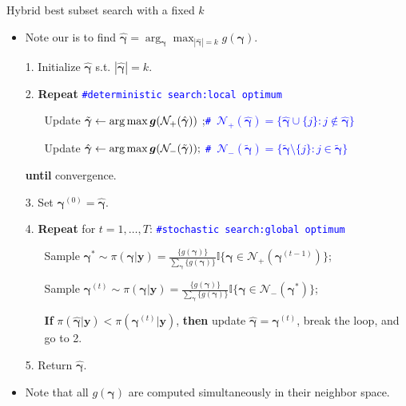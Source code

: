 \documentclass[citecolor=blue,10pt]{beamer}
\def\bg{{\boldsymbol \gamma}}
\newcommand{\0} {\mbox{\boldmath$0$}}
\newcommand{\uy}{{\boldsymbol y}}
\newcommand{\ug} {\mbox{\boldmath$g$}}
\begin{document}
\begin{frame}{Hybrid best subset search with a fixed $k$}
\begin{itemize}
  \item  Note our {\color{red}{Goal (i)}} is to find  $\hat\bg = \arg_{\bg}\max_{|\hat\bg|=k}g(\bg)$. 
  \item[1.] Initialize $\hat{\bg}$ s.t. $|\hat{\bg}|=k$.
  \item[2.] \textbf{Repeat} \quad  \texttt{\textcolor{blue}{\#deterministic search:local optimum}}
        \begin{itemize}\itemsep=2mm
         \item[] Update $\tilde{\bg }\leftarrow \arg\max \ug(\mathcal{N}_+(\hat{\bg} ) )$ ;\quad  \texttt{\textcolor{blue}{\# $\mathcal{N}_+(\hat{\bg})=\{\hat{\bg} \cup \{j\}: j\notin \hat{\bg} \}$}}
         \item[] Update $\hat{\bg}\leftarrow  \arg\max \ug( \mathcal{N}_-(\tilde{\bg} ) );$ \quad \texttt{\textcolor{blue}{\# $\mathcal{N}_-(\tilde{\bg })= \{\tilde{\bg } \setminus \{j\}: j\in \tilde{\bg } \}$}}
        \end{itemize}
  \item[] \textbf{until} convergence.
 \pause \item[3.] Set $\bg^{(0)}=\hat{\bg}$.
  \item[4.] \textbf{Repeat} for $t=1,\ldots,T$:  \quad  \texttt{\textcolor{blue}{\#stochastic search:global optimum}}
        \begin{itemize}\itemsep=2mm
         \item[] Sample $\bg^{*} \sim\pi (\bg |\uy)=\frac{\{g(\bg)\}}{\sum_{\bg}\{g(\bg)\}}\mathbb{I}\{\bg\in \mathcal{N}_+({\bg^{(t-1)}} ) \}$; 
         \item[] Sample $\bg^{(t)}\sim \pi (\bg |\uy)=\frac{\{g(\bg)\}}{\sum_{\bg}\{g(\bg)\}} \mathbb{I}\{\bg\in \mathcal{N}_-({\bg^{*}} ) \}$;
         \item[] \textbf{If} $\pi(\hat{\bg} |\uy)<\pi({\bg}^{(t)} |\uy)$, \textbf{then} update $\hat{\bg}=\bg^{(t)}$, break the loop, and go to 2.
        \end{itemize}
  \item[5.] Return $\hat{\bg}$.
  \item Note that all $g(\bg)$ are computed simultaneously in their neighbor space. 
 \end{itemize}
\end{frame}
\end{document}
